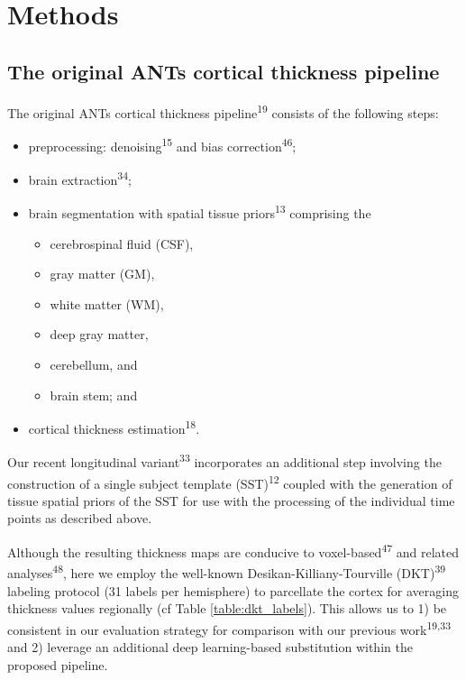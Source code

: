 \documentclass[12pt,]{article}
\providecommand{\tightlist}{%
  \setlength{\itemsep}{0pt}\setlength{\parskip}{0pt}}
\begin{document}
\hypertarget{methods}{%
\section*{Methods}\label{methods}}

\hypertarget{the-original-ants-cortical-thickness-pipeline}{%
\subsection*{The original ANTs cortical thickness
pipeline}\label{the-original-ants-cortical-thickness-pipeline}}

The original ANTs cortical thickness pipeline\textsuperscript{19}
consists of the following steps:

\begin{itemize}
\tightlist
\item
  preprocessing: denoising\textsuperscript{15} and bias
  correction\textsuperscript{46};
\item
  brain extraction\textsuperscript{34};
\item
  brain segmentation with spatial tissue priors\textsuperscript{13}
  comprising the

  \begin{itemize}
  \tightlist
  \item
    cerebrospinal fluid (CSF),
  \item
    gray matter (GM),
  \item
    white matter (WM),
  \item
    deep gray matter,
  \item
    cerebellum, and
  \item
    brain stem; and
  \end{itemize}
\item
  cortical thickness estimation\textsuperscript{18}.
\end{itemize}

Our recent longitudinal variant\textsuperscript{33} incorporates an
additional step involving the construction of a single subject template
(SST)\textsuperscript{12} coupled with the generation of tissue spatial
priors of the SST for use with the processing of the individual time
points as described above.

Although the resulting thickness maps are conducive to
voxel-based\textsuperscript{47} and related
analyses\textsuperscript{48}, here we employ the well-known
Desikan-Killiany-Tourville (DKT)\textsuperscript{39} labeling protocol
(31 labels per hemisphere) to parcellate the cortex for averaging
thickness values regionally (cf Table \ref{table:dkt_labels}). This
allows us to 1) be consistent in our evaluation strategy for comparison
with our previous work\textsuperscript{19,33} and 2) leverage an
additional deep learning-based substitution within the proposed
pipeline.
\end{document}
